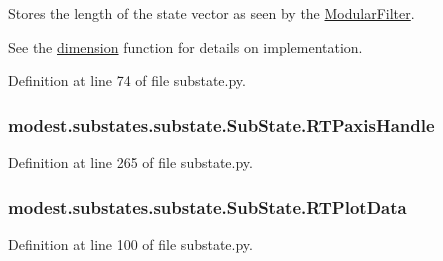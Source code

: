 Stores the length of the state vector as seen by the \hyperlink{namespacemodest_1_1ModularFilter}{Modular\+Filter}. 

See the \hyperlink{classmodest_1_1substates_1_1substate_1_1SubState_ab9027f6d1d7d57c47731612f519b7ee6}{dimension} function for details on implementation. 

Definition at line 74 of file substate.\+py.

\subsubsection[{\texorpdfstring{R\+T\+Paxis\+Handle}{RTPaxisHandle}}]{\setlength{\rightskip}{0pt plus 5cm}modest.\+substates.\+substate.\+Sub\+State.\+R\+T\+Paxis\+Handle}\hypertarget{classmodest_1_1substates_1_1substate_1_1SubState_a497ccbb6658589b02568e87c6382222e}{}\label{classmodest_1_1substates_1_1substate_1_1SubState_a497ccbb6658589b02568e87c6382222e}


Definition at line 265 of file substate.\+py.

\subsubsection[{\texorpdfstring{R\+T\+Plot\+Data}{RTPlotData}}]{\setlength{\rightskip}{0pt plus 5cm}modest.\+substates.\+substate.\+Sub\+State.\+R\+T\+Plot\+Data}\hypertarget{classmodest_1_1substates_1_1substate_1_1SubState_a9fefae1facc797a1132fb61a55e9ffa1}{}\label{classmodest_1_1substates_1_1substate_1_1SubState_a9fefae1facc797a1132fb61a55e9ffa1}


Definition at line 100 of file substate.\+py.


